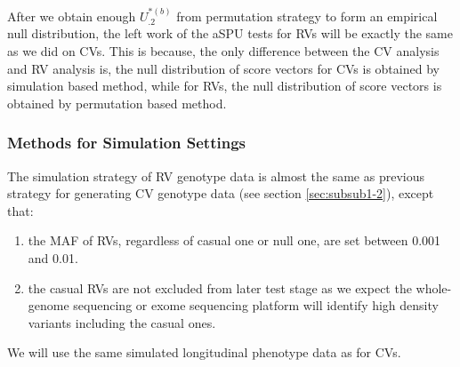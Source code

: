 \documentclass[12pt]{article}
\begin{document}
After we obtain enough $U_{.2}^{ *(b) }$ from permutation strategy to form an empirical null distribution, the left work of the aSPU tests for RVs will be exactly the same as we did on CVs. This is because, the only difference between the CV analysis and RV analysis is, the null distribution of score vectors for CVs is obtained by simulation based method, while for RVs, the null distribution of score vectors is obtained by permutation based method.

\subsubsection{Methods for Simulation Settings}\label{sec:subsub2-2}
The simulation strategy of RV genotype data is almost the same as previous strategy for generating CV genotype data (see section \ref{sec:subsub1-2}), except that:
\begin{enumerate}
\item the MAF of RVs, regardless of casual one or null one, are set between 0.001 and 0.01.
\item the casual RVs are not excluded from later test stage as we expect the whole-genome sequencing or exome sequencing platform will identify high density variants including the casual ones.
\end{enumerate}
We will use the same simulated longitudinal phenotype data as for CVs.
\end{document}
